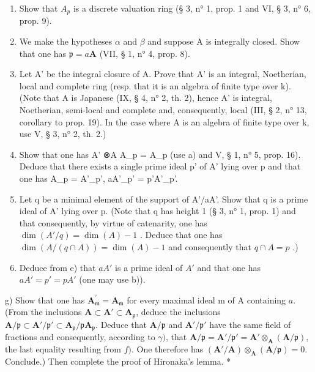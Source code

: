 \begin{enumerate}
\def\labelenumi{\alph{enumi})}
\item
  Show that \(A_p\) is a discrete valuation ring (§ 3, n° 1, prop. 1 and VI, § 3, n° 6, prop. 9).
\item
  We make the hypotheses \(\alpha\) and \(\beta\) and suppose A is integrally closed. Show that one has \(\mathfrak{p} = a\mathbf{A}\) (VII, § 1, n° 4, prop. 8).
\item
  Let A' be the integral closure of A. Prove that A' is an integral, Noetherian, local and complete ring (resp. that it is an algebra of finite type over k). (Note that A is Japanese (IX, § 4, n° 2, th. 2), hence A' is integral, Noetherian, semi-local and complete and, consequently, local (III, § 2, n° 13, corollary to prop. 19). In the case where A is an algebra of finite type over k, use V, § 3, n° 2, th. 2.)
\item
  Show that one has A' ⊗A A\_p = A\_p (use a) and V, § 1, n° 5, prop. 16). Deduce that there exists a single prime ideal p' of A' lying over p and that one has A\_p = A'\_p', aA'\_p' = p'A'\_p'.
\item
  Let q be a minimal element of the support of A'/aA'. Show that q is a prime ideal of A' lying over p. (Note that q has height 1 (§ 3, n° 1, prop. 1) and that consequently, by virtue of catenarity, one has \(\dim(A'/q)=\dim(A)-1\) . Deduce that one has \(\dim(A/(q \cap A))=\dim(A)-1\) and consequently that \(q \cap A = p\) .)
\item
  Deduce from e) that \(aA'\) is a prime ideal of \(A'\) and that one has \(aA' = p' = pA'\) (one may use b)).
\end{enumerate}

g) Show that one has \(\mathbf{A}_{\mathfrak{m}}^{\prime} = \mathbf{A}_{\mathfrak{m}}\) for every maximal ideal m of A containing \(a\). (From the inclusions \(\mathbf{A} \subset \mathbf{A}' \subset \mathbf{A}_{\mathfrak{p}}\), deduce the inclusions \(\mathbf{A}/\mathfrak{p} \subset \mathbf{A}'/\mathfrak{p}' \subset \mathbf{A}_{\mathfrak{p}}/\mathfrak{p}\mathbf{A}_{\mathfrak{p}}\). Deduce that \(\mathbf{A}/\mathfrak{p}\) and \(\mathbf{A}'/\mathfrak{p}'\) have the same field of fractions and consequently, according to \(\gamma)\), that \(\mathbf{A}/\mathfrak{p} = \mathbf{A}'/\mathfrak{p}' = \mathbf{A}' \otimes_{\mathbf{A}} (\mathbf{A}/\mathfrak{p})\), the last equality resulting from \(f)\). One therefore has \((\mathbf{A}'/\mathbf{A}) \otimes_{\mathbf{A}} (\mathbf{A}/\mathfrak{p}) = 0\). Conclude.) Then complete the proof of Hironaka's lemma. *

